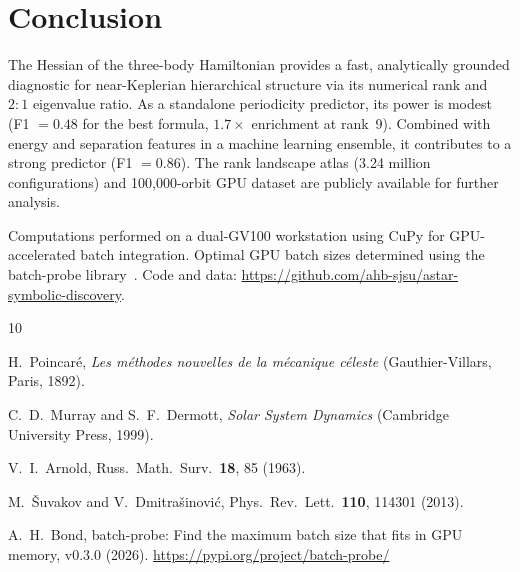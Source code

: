 \documentclass[aps,pre,twocolumn,superscriptaddress,floatfix]{revtex4-2}
\begin{document}
\section{Conclusion}

The Hessian of the three-body Hamiltonian provides a fast, analytically
grounded diagnostic for near-Keplerian hierarchical structure via its
numerical rank and $2{:}1$ eigenvalue ratio. As a standalone periodicity
predictor, its power is modest (F1 $= 0.48$ for the best formula,
$1.7\times$ enrichment at rank~9). Combined with energy and separation
features in a machine learning ensemble, it contributes to a strong
predictor (F1 $= 0.86$). The rank landscape atlas (3.24 million
configurations) and 100{,}000-orbit GPU dataset are publicly available
for further analysis.

\begin{acknowledgments}
Computations performed on a dual-GV100 workstation using CuPy for
GPU-accelerated batch integration. Optimal GPU batch sizes determined
using the batch-probe library~\cite{batchprobe}.
Code and data: \url{https://github.com/ahb-sjsu/astar-symbolic-discovery}.
\end{acknowledgments}

\begin{thebibliography}{10}

H.~Poincar{\'e}, \emph{Les m{\'e}thodes nouvelles de la
m{\'e}canique c{\'e}leste} (Gauthier-Villars, Paris, 1892).

C.~D.~Murray and S.~F.~Dermott, \emph{Solar System Dynamics}
(Cambridge University Press, 1999).

V.~I.~Arnold, Russ.\ Math.\ Surv.\ \textbf{18}, 85 (1963).

M.~\v{S}uvakov and V.~Dmitra\v{s}inovi\'{c}, Phys.\ Rev.\ Lett.\
\textbf{110}, 114301 (2013).

A.~H.~Bond, batch-probe: Find the maximum batch size that fits in
GPU memory, v0.3.0 (2026). \url{https://pypi.org/project/batch-probe/}

\end{thebibliography}
\end{document}

